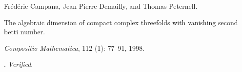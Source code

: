 Fr{\'e}d{\'e}ric Campana, Jean-Pierre Demailly, and Thomas Peternell.

\newblock The algebraic dimension of compact complex threefolds with vanishing
  second betti number.

\newblock \emph{Compositio Mathematica}, 112 (1): 77--91,
  1998.

\newblock {}.
\newblock \emph{Verified}.

